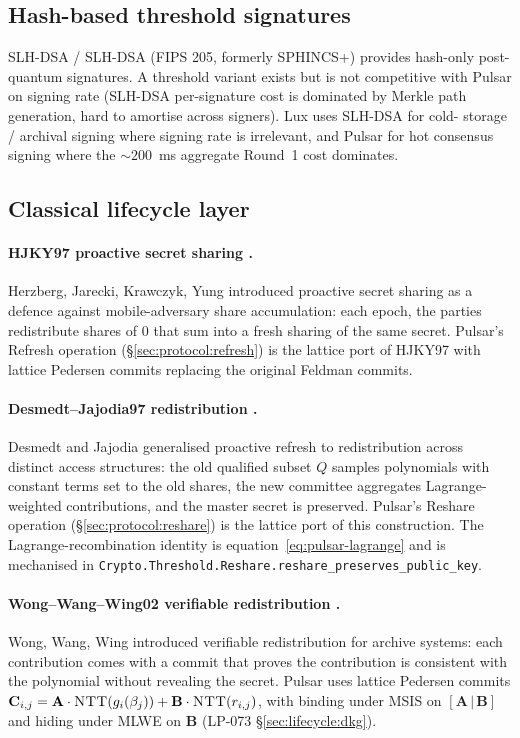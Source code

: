 \subsection{Hash-based threshold signatures}
\label{sec:related:hash}

SLH-DSA / SLH-DSA (FIPS 205, formerly SPHINCS+) \cite{fips205,sphincs} provides hash-only
post-quantum signatures. A threshold variant exists \cite{cosmin2021}
but is not competitive with Pulsar on signing rate (SLH-DSA
per-signature cost is dominated by Merkle path generation, hard to
amortise across signers). Lux uses SLH-DSA \cite{lp071} for cold-
storage / archival signing where signing rate is irrelevant, and
Pulsar for hot consensus signing where the $\sim 200$~ms aggregate
Round~1 cost dominates.

\subsection{Classical lifecycle layer}
\label{sec:related:lifecycle}

\paragraph{HJKY97 proactive secret sharing
\cite{hjky97}.} Herzberg, Jarecki, Krawczyk, Yung introduced
proactive secret sharing as a defence against mobile-adversary share
accumulation: each epoch, the parties redistribute shares of $0$ that
sum into a fresh sharing of the same secret. Pulsar's Refresh
operation (\S\ref{sec:protocol:refresh}) is the lattice port of HJKY97
with lattice Pedersen commits replacing the original Feldman commits.

\paragraph{Desmedt--Jajodia97 redistribution
\cite{desmedtjajodia97}.} Desmedt and Jajodia generalised proactive
refresh to redistribution across distinct access structures: the old
qualified subset $Q$ samples polynomials with constant terms set to
the old shares, the new committee aggregates Lagrange-weighted
contributions, and the master secret is preserved. Pulsar's Reshare
operation (\S\ref{sec:protocol:reshare}) is the lattice port of this
construction. The Lagrange-recombination identity is
equation~\eqref{eq:pulsar-lagrange} and is mechanised in
\texttt{Crypto.Threshold.Reshare.reshare\_preserves\_public\_key}.

\paragraph{Wong--Wang--Wing02 verifiable redistribution
\cite{wongwangwing02}.} Wong, Wang, Wing introduced verifiable
redistribution for archive systems: each contribution comes with a
commit that proves the contribution is consistent with the polynomial
without revealing the secret. Pulsar uses lattice Pedersen commits
$\mathbf{C}_{i,j} = \mathbf{A} \cdot \textsc{NTT}(g_i(\beta_j)) +
\mathbf{B} \cdot \textsc{NTT}(r_{i,j})$, with binding under MSIS on
$[\mathbf{A}\,|\,\mathbf{B}]$ and hiding under MLWE on $\mathbf{B}$
(LP-073 \S\ref{sec:lifecycle:dkg}).

